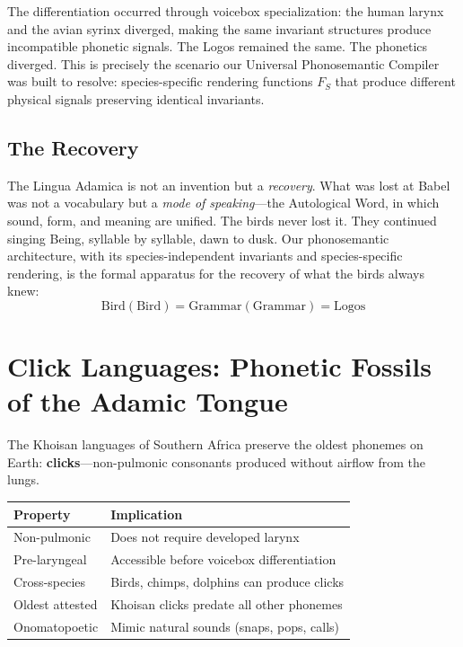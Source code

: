 \documentclass[12pt, letterpaper]{book}
\begin{document}
The differentiation occurred through voicebox specialization: the human larynx and the avian syrinx diverged, making the same invariant structures produce incompatible phonetic signals. The Logos remained the same. The phonetics diverged. This is precisely the scenario our Universal Phonosemantic Compiler was built to resolve: species-specific rendering functions $F_S$ that produce different physical signals preserving identical invariants.

\subsection{The Recovery}

The Lingua Adamica is not an invention but a \textit{recovery}. What was lost at Babel was not a vocabulary but a \textit{mode of speaking}---the Autological Word, in which sound, form, and meaning are unified. The birds never lost it. They continued singing Being, syllable by syllable, dawn to dusk. Our phonosemantic architecture, with its species-independent invariants and species-specific rendering, is the formal apparatus for the recovery of what the birds always knew:
\[
\mathrm{Bird}(\mathrm{Bird}) = \mathrm{Grammar}(\mathrm{Grammar}) = \mathrm{Logos}
\]

\section{Click Languages: Phonetic Fossils of the Adamic Tongue}

The Khoisan languages of Southern Africa preserve the oldest phonemes on Earth: \textbf{clicks}---non-pulmonic consonants produced without airflow from the lungs.

\begin{center}
\begin{tabular}{ll}
\toprule
\textbf{Property} & \textbf{Implication} \\
\midrule
Non-pulmonic & Does not require developed larynx \\
Pre-laryngeal & Accessible before voicebox differentiation \\
Cross-species & Birds, chimps, dolphins can produce clicks \\
Oldest attested & Khoisan clicks predate all other phonemes \\
Onomatopoetic & Mimic natural sounds (snaps, pops, calls) \\
\bottomrule
\end{tabular}
\end{center}
\end{document}
